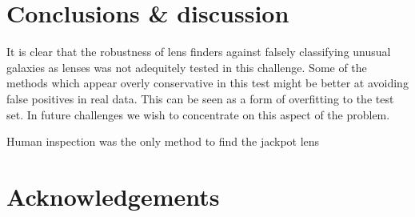 \documentclass[useAMS,usenatbib]{mn2e}
\begin{document}
\section{Conclusions \& discussion}

It is clear that the robustness of lens finders against falsely classifying unusual galaxies as lenses was not adequitely tested in this challenge.  Some of the methods which appear overly conservative in this test might be better at avoiding false positives in real data.  This can be seen as a form of overfitting to the test set.
In future challenges we wish to concentrate on this aspect of the problem.

Human inspection was the only method to find the jackpot lens

\section*{Acknowledgements}







\appendix

\label{lastpage}
\end{document}
